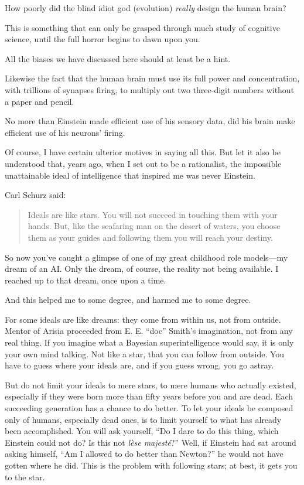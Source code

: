 {
 How poorly did the blind idiot god (evolution) \textit{really}
design the human brain?}

{
 This is something that can only be grasped through much study of
cognitive science, until the full horror begins to dawn upon you.}

{
 All the biases we have discussed here should at least be a hint.}

{
 Likewise the fact that the human brain must use its full power and
concentration, with trillions of synapses firing, to multiply out two
three-digit numbers without a paper and pencil.}

{
 No more than Einstein made efficient use of his sensory data, did
his brain make efficient use of his neurons' firing.}

{
 Of course, I have certain ulterior motives in saying all this. But
let it also be understood that, years ago, when I set out to be a
rationalist, the impossible unattainable ideal of intelligence that
inspired me was never Einstein.}

{
 Carl Schurz said:}

\begin{quote}
{
 Ideals are like stars. You will not succeed in touching them with
your hands. But, like the seafaring man on the desert of waters, you
choose them as your guides and following them you will reach your
destiny.}
\end{quote}

{
 So now you've caught a glimpse of one of my great
childhood role models---my dream of an AI. Only the dream, of course,
the reality not being available. I reached up to that dream, once upon
a time.}

{
 And this helped me to some degree, and harmed me to some degree.}

{
 For some ideals are like dreams: they come from within us, not
from outside. Mentor of Arisia proceeded from E. E.
``doc'' Smith's
imagination, not from any real thing. If you imagine what a Bayesian
superintelligence would say, it is only your own mind talking. Not like
a star, that you can follow from outside. You have to guess where your
ideals are, and if you guess wrong, you go astray.}

{
 But do not limit your ideals to mere stars, to mere humans who
actually existed, especially if they were born more than fifty years
before you and are dead. Each succeeding generation has a chance to do
better. To let your ideals be composed only of humans, especially dead
ones, is to limit yourself to what has already been accomplished. You
will ask yourself, ``Do I dare to do this thing, which
Einstein could not do? Is this not \textit{lèse
majesté}?'' Well, if Einstein had sat around asking
himself, ``Am I allowed to do better than
Newton?'' he would not have gotten where he did. This
is the problem with following stars; at best, it gets you to the star.}

